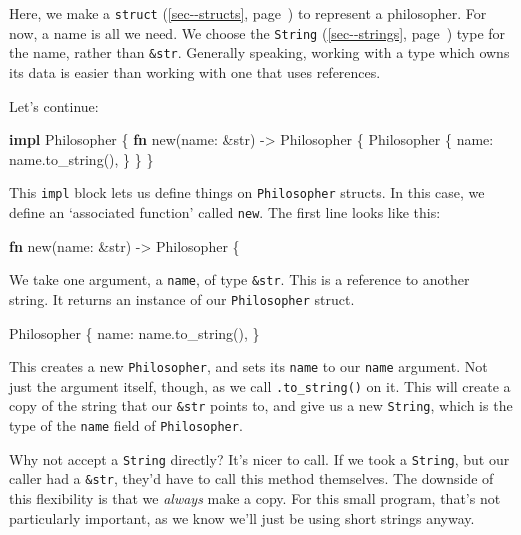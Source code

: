 \documentclass[a4paper,]{book}
\renewcommand*{\hyperref}[2][\ar]{%
  \def\ar{#2}%
  #2 (\autoref{#1}, page~\pageref{#1})}
\newenvironment{Shaded}{\begin{snugshade}}{\end{snugshade}}
\newcommand{\KeywordTok}[1]{\textcolor[rgb]{0.13,0.29,0.53}{\textbf{{#1}}}}
\newcommand{\DataTypeTok}[1]{\textcolor[rgb]{0.13,0.29,0.53}{{#1}}}
\newcommand{\NormalTok}[1]{{#1}}
\begin{document}
Here, we make a \hyperref[sec--structs]{\texttt{struct}} to represent a
philosopher. For now, a name is all we need. We choose the
\hyperref[sec--strings]{\texttt{String}} type for the name, rather than
\texttt{\&str}. Generally speaking, working with a type which owns its
data is easier than working with one that uses references.

Let's continue:

\begin{Shaded}
\begin{Highlighting}[]
\KeywordTok{impl} \NormalTok{Philosopher \{}
    \KeywordTok{fn} \NormalTok{new(name: &}\DataTypeTok{str}\NormalTok{) -> Philosopher \{}
        \NormalTok{Philosopher \{}
            \NormalTok{name: name.to_string(),}
        \NormalTok{\}}
    \NormalTok{\}}
\NormalTok{\}}
\end{Highlighting}
\end{Shaded}

This \texttt{impl} block lets us define things on \texttt{Philosopher}
structs. In this case, we define an `associated function' called
\texttt{new}. The first line looks like this:

\begin{Shaded}
\begin{Highlighting}[]
\KeywordTok{fn} \NormalTok{new(name: &}\DataTypeTok{str}\NormalTok{) -> Philosopher \{}
\end{Highlighting}
\end{Shaded}

We take one argument, a \texttt{name}, of type \texttt{\&str}. This is a
reference to another string. It returns an instance of our
\texttt{Philosopher} struct.

\begin{Shaded}
\begin{Highlighting}[]
\NormalTok{Philosopher \{}
    \NormalTok{name: name.to_string(),}
\NormalTok{\}}
\end{Highlighting}
\end{Shaded}

This creates a new \texttt{Philosopher}, and sets its \texttt{name} to
our \texttt{name} argument. Not just the argument itself, though, as we
call \texttt{.to\_string()} on it. This will create a copy of the string
that our \texttt{\&str} points to, and give us a new \texttt{String},
which is the type of the \texttt{name} field of \texttt{Philosopher}.

Why not accept a \texttt{String} directly? It's nicer to call. If we
took a \texttt{String}, but our caller had a \texttt{\&str}, they'd have
to call this method themselves. The downside of this flexibility is that
we \emph{always} make a copy. For this small program, that's not
particularly important, as we know we'll just be using short strings
anyway.
\end{document}
